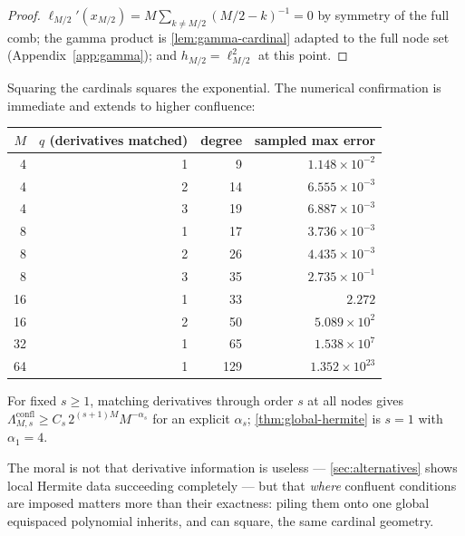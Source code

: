 \documentclass[11pt,oneside]{article}
\numberwithin{equation}{section}
\theoremstyle{definition}
\theoremstyle{remark}
\begin{document}
\begin{proof}
$\ell_{M/2}'(x_{M/2})=M\sum_{k\ne M/2}(M/2-k)^{-1}=0$ by symmetry of
the full comb; the gamma product is \cref{lem:gamma-cardinal} adapted
to the full node set (Appendix~\ref{app:gamma}); and $h_{M/2}=\ell_{M/2}^{2}$
at this point.
\end{proof}

Squaring the cardinals squares the exponential.  The numerical
confirmation is immediate and extends to higher confluence:

\begin{center}
\small
\begin{tabular}{rrrr}
\toprule
$M$ & $q$ (derivatives matched) & degree & sampled max error \\
\midrule
4  & 1 & 9   & $1.148\times10^{-2}$ \\
4  & 2 & 14  & $6.555\times10^{-3}$ \\
4  & 3 & 19  & $6.887\times10^{-3}$ \\
8  & 1 & 17  & $3.736\times10^{-3}$ \\
8  & 2 & 26  & $4.435\times10^{-3}$ \\
8  & 3 & 35  & $2.735\times10^{-1}$ \\
16 & 1 & 33  & $2.272$ \\
16 & 2 & 50  & $5.089\times10^{2}$ \\
32 & 1 & 65  & $1.538\times10^{7}$ \\
64 & 1 & 129 & $1.352\times10^{23}$ \\
\bottomrule
\end{tabular}
\label{tab:full-hermite}
\end{center}

\begin{conjecture}
\label{conj:higher-hermite}
For fixed $s\ge1$, matching derivatives through order $s$ at all
nodes gives
$\Lambda^{\mathrm{confl}}_{M,s}\ge C_s\,2^{(s+1)M}M^{-\alpha_s}$ for
an explicit $\alpha_s$;
\cref{thm:global-hermite} is $s=1$ with $\alpha_1=4$.
\end{conjecture}

The moral is not that derivative information is useless ---
\cref{sec:alternatives} shows local Hermite data succeeding
completely --- but that \emph{where} confluent conditions are imposed
matters more than their exactness: piling them onto one global
equispaced polynomial inherits, and can square, the same cardinal
geometry.
\end{document}
